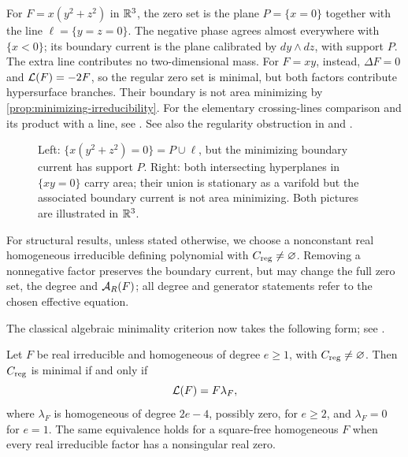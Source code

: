 \begin{example}
\label{rem:reducible-minimal-equations}
For \(F=x(y^2+z^2)\) in \(\mathbb R^3\), the zero set is the plane
\(P=\{x=0\}\) together with the line \(\ell=\{y=z=0\}\).
The negative phase agrees almost everywhere with \(\{x<0\}\);
its boundary current is the plane calibrated by \(dy\wedge dz\),
with support \(P\). The extra line contributes no two-dimensional mass.
For \(F=xy\), instead, \(\Delta F=0\) and \(\mathcal L(F)=-2F\),
so the regular zero set is minimal, but both factors contribute
hypersurface branches. Their boundary is not area minimizing by
\cref{prop:minimizing-irreducibility}. For the elementary crossing-lines
comparison and its product with a line, see
\cite[Figures~10.1.3 and~10.7.1, Lemma~10.6]{Morgan16}.
See also the regularity
obstruction in \cite[Theorem~28.1]{Maggi12} and
\cite[Section~1 and Theorem~1]{Federer70}.
\end{example}

\begin{figure}[htbp]
\centering

\caption{Left: \(\{x(y^2+z^2)=0\}=P\cup\ell\), but the minimizing
boundary current has support \(P\). Right: both intersecting
hyperplanes in \(\{xy=0\}\) carry area; their union is stationary
as a varifold but the associated boundary current is not area minimizing.
Both pictures are illustrated in \(\mathbb R^3\).}
\label{fig:reducible-cones}
\end{figure}

\label{par:irreducible-convention}
For structural results, unless stated otherwise, we choose a nonconstant
real homogeneous irreducible defining polynomial with \(C_{\mathrm{reg}}\ne\varnothing\).
Removing a nonnegative factor preserves the boundary current, but may
change the full zero set, the degree and \(\mathcal A_R(F)\); all degree
and generator statements refer to the chosen effective equation.

The classical algebraic minimality criterion now takes the following
form; see \cite[Section~6.2.1, equation~(6.2.2)]{NadirashviliTkachevVladut14}.

\begin{proposition}
\label{prop:divisibility}
Let \(F\) be real irreducible and homogeneous of degree \(e\ge1\),
with \(C_{\mathrm{reg}}\ne\varnothing\). Then \(C_{\mathrm{reg}}\) is minimal
if and only if
\begin{equation}\label{eq:L-divisibility}
 \mathcal L(F)=F\lambda_F,
\end{equation}
where \(\lambda_F\) is homogeneous of degree \(2e-4\), possibly
zero, for \(e\ge2\), and \(\lambda_F=0\) for \(e=1\).
The same equivalence holds for a square-free homogeneous \(F\)
when every real irreducible factor has a nonsingular real zero.
\end{proposition}

